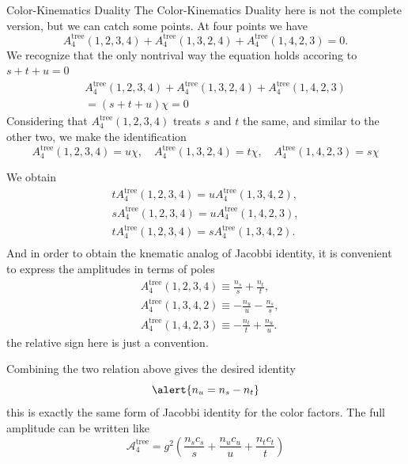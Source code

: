 \documentclass{beamer}
\begin{document}
\begin{frame}{Color-Kinematics Duality }
The Color-Kinematics Duality here is not the complete version, but we can catch some points.
At four points we have
\begin{equation*}
    A_4^{\mathrm{tree}}(1,2,3,4)+    A_4^{\mathrm{tree}}(1,3,2,4)+    A_4^{\mathrm{tree}}(1,4,2,3)=0.
\end{equation*}
We recognize that the only nontrival way the equation holds accoring to $s+t+u=0$ 
\begin{align*}
    &A_4^{\mathrm{tree}}(1,2,3,4)+    A_4^{\mathrm{tree}}(1,3,2,4)+    A_4^{\mathrm{tree}}(1,4,2,3)\\
\quad&= (s+t+u)\chi=0
\end{align*} 
Considering that $A_4^{\mathrm{tree}}(1,2,3,4)$ treats $s$ and $t$ the same, and similar to the other two, we make the identification
\begin{equation*}
    A_4^{\mathrm{tree}}(1,2,3,4)=u\chi,\quad   A_4^{\mathrm{tree}}(1,3,2,4)=t\chi,\quad    A_4^{\mathrm{tree}}(1,4,2,3)=s\chi
\end{equation*}
\end{frame}
\begin{frame}
    We obtain
    \begin{align*}
        tA_4^{\mathrm{tree}}(1,2,3,4)=uA_4^{\mathrm{tree}}(1,3,4,2),\\
        sA_4^{\mathrm{tree}}(1,2,3,4)=uA_4^{\mathrm{tree}}(1,4,2,3),\\
        tA_4^{\mathrm{tree}}(1,2,3,4)=sA_4^{\mathrm{tree}}(1,3,4,2).\\
    \end{align*}
    And in order to obtain the knematic analog of Jacobbi identity, it is convenient to express the amplitudes in terms of poles
\begin{align*}
    &A_4^{\mathrm{tree}}(1,2,3,4)\equiv\frac{n_s}{s}+\frac{n_t}{t},\\
    &A_4^{\mathrm{tree}}(1,3,4,2)\equiv-\frac{n_u}{u}-\frac{n_s}{s},\\
    &A_4^{\mathrm{tree}}(1,4,2,3)\equiv-\frac{n_t}{t}+\frac{n_u}{u}.
\end{align*}
the relative sign here is just a convention.
\end{frame}
\begin{frame}
    Combining the two relation above gives the desired identity
    \begin{equation*}
        \alert{n_u=n_s-n_t}
    \end{equation*}
    this is exactly the same form of Jacobbi identity for the color factors.
    The full amplitude can be written like
\begin{equation*}
    \mathcal{A}_4^{\mathrm{tree}}=g^2\left(\frac{n_sc_s}{s}+\frac{n_uc_u}{u}+\frac{n_tc_t}{t}\right)
\end{equation*}
\end{frame}
\end{document}
